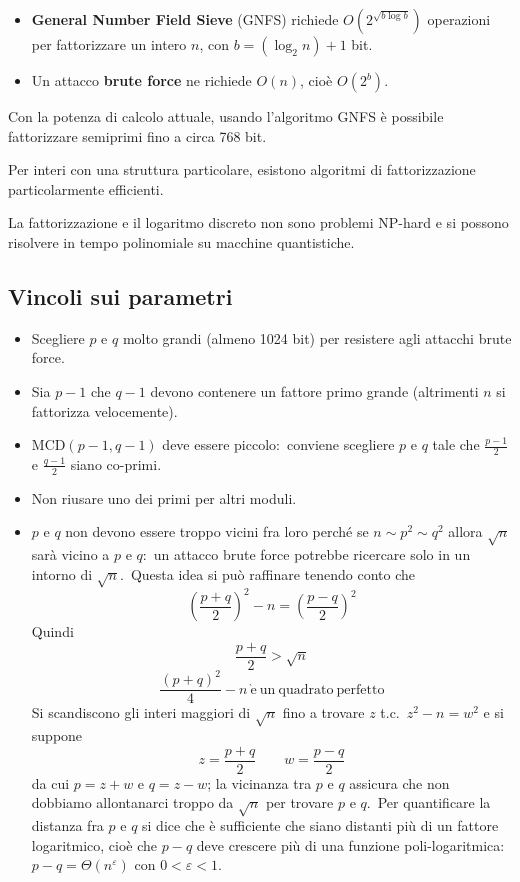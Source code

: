 \begin{itemize}
    \item \textbf{General Number Field Sieve} (GNFS) richiede $O\left( 2^{\sqrt{b \log b}}\right)$ operazioni per fattorizzare un intero $n$, con $b = (\log_2 n)+1$ bit.\
    \item Un attacco \textbf{brute force} ne richiede $O(n)$, cioè $O(2^b)$.
\end{itemize}

\noindent Con la potenza di calcolo attuale, usando l'algoritmo GNFS è possibile fattorizzare semiprimi fino a circa 768 bit.\

Per interi con una struttura particolare, esistono algoritmi di fattorizzazione particolarmente efficienti.\

La fattorizzazione e il logaritmo discreto non sono problemi NP-hard e si possono risolvere in tempo polinomiale su macchine quantistiche.\

\subsection{Vincoli sui parametri}

\begin{itemize}
    \item Scegliere $p$ e $q$ molto grandi (almeno 1024 bit) per resistere agli attacchi brute force.
    \item Sia $p - 1$ che $q - 1$ devono contenere un fattore primo grande (altrimenti $n$ si fattorizza velocemente).
    \item $\mathrm{MCD}(p - 1, q - 1)$ deve essere piccolo:\ conviene scegliere $p$ e $q$ tale che $\frac{p - 1}{2}$ e $\frac{q - 1}{2}$ siano co-primi.
    \item Non riusare uno dei primi per altri moduli.
    \item $p$ e $q$ non devono essere troppo vicini fra loro perché se $n \sim p^2 \sim q^2$ allora $\sqrt n$ sarà vicino a $p$ e $q$:\ un attacco brute force potrebbe ricercare solo in un intorno di $\sqrt n$.\ Questa idea si può raffinare tenendo conto che
          \[\left(\frac{p+q}{2}\right)^2 - n =\left(\frac{p-q}{2}\right)^2 \]
          Quindi
          \[\frac{p+q}{2} > \sqrt n\]
          \[\frac{(p+q)^2}{4} - n\ \mathrm{\grave{e}\ un\ quadrato\ perfetto}\]
          Si scandiscono gli interi maggiori di $\sqrt n$ fino a trovare $z$ t.c.\ $z^2 - n = w^2$ e si suppone
          \[z = \frac{p+q}{2}\qquad w =\frac{p-q}{2}\]
          da cui $p = z +w$ e $q = z-w$; la vicinanza tra $p$ e $q$ assicura che non dobbiamo allontanarci troppo da $\sqrt n$ per trovare $p$ e $q$.\
          Per quantificare la distanza fra $p$ e $q$ si dice che è sufficiente che siano distanti più di un fattore logaritmico, cioè che $p - q$ deve crescere più di una funzione poli-logaritmica: $p - q = \Theta(n^\varepsilon)$ con $0 < \varepsilon < 1$.\
\end{itemize}

